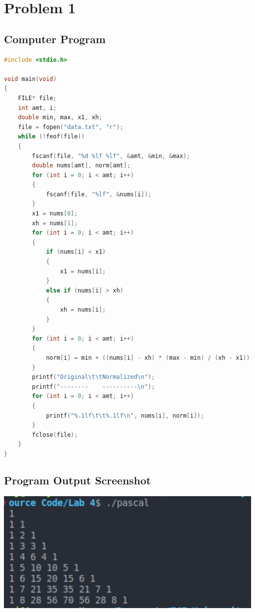 {}

\section{{Problem 1}}

	\subsection{{Computer Program}}

		\begin{lstlisting}[language=C, caption=\textit{Program to print the values of the Pascal's Triangle in Sequential Order}]
#include <stdio.h>

void main(void)
{
    FILE* file;
    int amt, i;
    double min, max, x1, xh;
    file = fopen("data.txt", "r");
    while (!feof(file))
    {
        fscanf(file, "%d %lf %lf", &amt, &min, &max);
        double nums[amt], norm[amt];
        for (int i = 0; i < amt; i++)
        {
            fscanf(file, "%lf", &nums[i]);
        }
        x1 = nums[0];
        xh = nums[1];
        for (int i = 0; i < amt; i++)
        {
            if (nums[i] < x1)
            {
                x1 = nums[i];
            }
            else if (nums[i] > xh)
            {
                xh = nums[i];
            }            
        }
        for (int i = 0; i < amt; i++)
        {
            norm[i] = min + ((nums[i] - xh) * (max - min) / (xh - x1));
        }
        printf("Original\t\tNormalized\n");
        printf("--------    ----------\n");
        for (int i = 0; i < amt; i++)
        {
            printf("%.1lf\t\t%.1lf\n", nums[i], norm[i]);
        }
        fclose(file);
    }
}


\end{lstlisting}

	\subsection{{Program Output Screenshot}}

		\includegraphics[width=15cm]{pascal.png}
		
